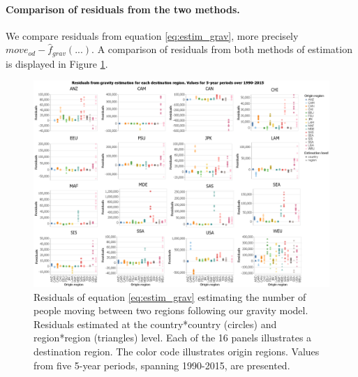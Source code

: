 \documentclass[letterpaper,11pt]{article}
\begin{document}
\paragraph{Comparison of residuals from the two methods.} We compare residuals from equation \ref{eq:estim_grav}, more precisely $move_{od} - \hat{f}_{grav}(...)$. A comparison of residuals from both methods of estimation is displayed in Figure \ref{residual}.

\begin{figure}[H]
	\centering
	\includegraphics[width=\textwidth]{residuals_countryregion.png}
	\caption{Residuals of equation \ref{eq:estim_grav} estimating the number of people moving between two regions following our gravity model. Residuals estimated at the country*country (circles) and region*region (triangles) level. Each of the 16 panels illustrates a destination region. The color code illustrates origin regions. Values from five 5-year periods, spanning 1990-2015, are presented.}
	\label{residual}
\end{figure}
\end{document}
